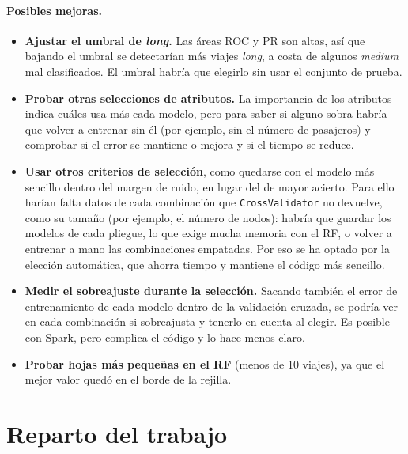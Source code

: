 \documentclass[12pt,a4paper]{article}
\begin{document}
\paragraph{Posibles mejoras.}
\begin{itemize}
    \item \textbf{Ajustar el umbral de \textit{long}.} Las áreas \acs{ROC} y
    \acs{PR} son altas, así que bajando el umbral se detectarían más viajes
    \textit{long}, a costa de algunos \textit{medium} mal clasificados. El
    umbral habría que elegirlo sin usar el conjunto de prueba.
    \item \textbf{Probar otras selecciones de atributos.} La importancia de
    los atributos indica cuáles usa más cada modelo, pero para saber si
    alguno sobra habría que volver a entrenar sin él (por ejemplo, sin el
    número de pasajeros) y comprobar si el error se mantiene o mejora y si
    el tiempo se reduce.
    \item \textbf{Usar otros criterios de selección}, como quedarse con el
    modelo más sencillo dentro del margen de ruido, en lugar del de mayor
    acierto. Para ello harían falta datos de cada combinación que
    \texttt{CrossValidator} no devuelve, como su tamaño (por ejemplo, el
    número de nodos): habría que guardar los modelos de cada pliegue, lo
    que exige mucha memoria con el \ac{RF}, o volver a entrenar a mano las
    combinaciones empatadas. Por eso se ha optado por la elección
    automática, que ahorra tiempo y mantiene el código más sencillo.
    \item \textbf{Medir el sobreajuste durante la selección.} Sacando
    también el error de entrenamiento de cada modelo dentro de la
    validación cruzada, se podría ver en cada combinación si sobreajusta y
    tenerlo en cuenta al elegir. Es posible con Spark, pero complica el
    código y lo hace menos claro.
    \item \textbf{Probar hojas más pequeñas en el \ac{RF}} (menos de 10
    viajes), ya que el mejor valor quedó en el borde de la rejilla.
\end{itemize}




\newpage
\section{Reparto del trabajo}
\end{document}
